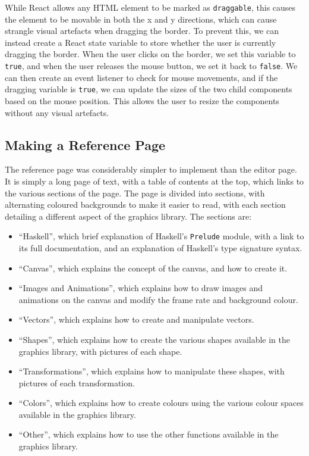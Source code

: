 \documentclass[../main.tex]{subfiles}
\begin{document}
            While React allows any HTML element to be marked as \texttt{draggable}, this
                causes the element to be movable in both the x and y directions, which can
                cause strangle visual artefacts when dragging the border.
            To prevent this, we can instead create a React state variable to store whether
                the user is currently dragging the border.
            When the user clicks on the border, we set this variable to \texttt{true}, and
                when the user releases the mouse button, we set it back to \texttt{false}.
            We can then create an event listener to check for mouse movements, and if the
                dragging variable is \texttt{true}, we can update the sizes of the two child
                components based on the mouse position.
            This allows the user to resize the components without any visual artefacts.

        \subsection{Making a Reference Page}
            The reference page was considerably simpler to implement than the editor page.
            It is simply a long page of text, with a table of contents at the top, which
                links to the various sections of the page.
            The page is divided into sections, with alternating coloured backgrounds to
                make it easier to read, with each section detailing a different aspect of the
                graphics library.
            The sections are:
            \begin{itemize}
                \item ``Haskell'', which brief explanation of Haskell's \texttt{Prelude} module, with a link to its
                      full documentation, and an explanation of Haskell's type signature syntax.
                \item ``Canvas'', which explains the concept of the canvas, and how to create it.
                \item ``Images and Animations'', which explains how to draw images and animations on the canvas and
                      modify the frame rate and background colour.
                \item ``Vectors'', which explains how to create and manipulate vectors.
                \item ``Shapes'', which explains how to create the various shapes available in the graphics library,
                      with pictures of each shape.
                \item ``Transformations'', which explains how to manipulate these shapes, with pictures of each
                      transformation.
                \item ``Colors'', which explains how to create colours using the various colour spaces available in
                      the graphics library.
                \item ``Other'', which explains how to use the other functions available in the graphics library.
            \end{itemize}
\end{document}
